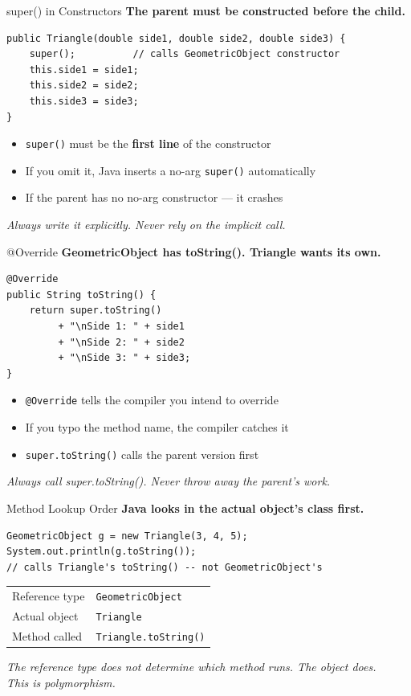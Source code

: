 \documentclass{beamer}
\begin{document}
\begin{frame}[fragile]{super() in Constructors}
\textbf{The parent must be constructed before the child.}
\begin{lstlisting}
public Triangle(double side1, double side2, double side3) {
    super();          // calls GeometricObject constructor
    this.side1 = side1;
    this.side2 = side2;
    this.side3 = side3;
}
\end{lstlisting}
\vspace{0.3cm}
\begin{itemize}
  \item \texttt{super()} must be the \textbf{first line} of the constructor
  \item If you omit it, Java inserts a no-arg \texttt{super()} automatically
  \item If the parent has no no-arg constructor --- it crashes
\end{itemize}
\vspace{0.2cm}
\textit{Always write it explicitly. Never rely on the implicit call.}
\end{frame}
\begin{frame}[fragile]{@Override}
\textbf{GeometricObject has toString(). Triangle wants its own.}
\begin{lstlisting}
@Override
public String toString() {
    return super.toString()
         + "\nSide 1: " + side1
         + "\nSide 2: " + side2
         + "\nSide 3: " + side3;
}
\end{lstlisting}
\vspace{0.3cm}
\begin{itemize}
  \item \texttt{@Override} tells the compiler you intend to override
  \item If you typo the method name, the compiler catches it
  \item \texttt{super.toString()} calls the parent version first
\end{itemize}
\vspace{0.2cm}
\textit{Always call super.toString(). Never throw away the parent's work.}
\end{frame}
\begin{frame}[fragile]{Method Lookup Order}
\textbf{Java looks in the actual object's class first.}
\begin{lstlisting}
GeometricObject g = new Triangle(3, 4, 5);
System.out.println(g.toString());
// calls Triangle's toString() -- not GeometricObject's
\end{lstlisting}
\vspace{0.3cm}
\begin{tabular}{ll}
Reference type & \texttt{GeometricObject} \\
Actual object & \texttt{Triangle} \\
Method called & \texttt{Triangle.toString()} \\
\end{tabular}
\vspace{0.3cm}
\textit{The reference type does not determine which method runs. The object does.}\\
\textit{This is polymorphism.}
\end{frame}
\end{document}
